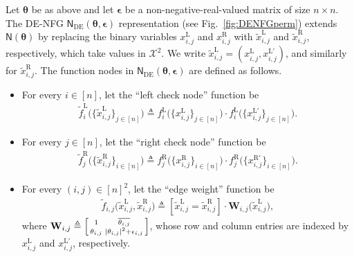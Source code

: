 \documentclass[conference]{IEEEtran}
\theoremstyle{plain}
\theoremstyle{definition}
\newcommand{\sfn}{\mathsf{N}}
\newcommand{\fr}[1]{ f^{\mathrm{R}}_{ #1 } }
\newcommand{\fl}[1]{ f^{\mathrm{L}}_{ #1 } }
\newcommand{\xr}[1]{ x^{\mathrm{R}}_{ #1 } }
\newcommand{\xl}[1]{ x^{\mathrm{L}}_{ #1 } }
\newcommand{\xlprime}[1]{ x^{\mathrm{L}'}_{ #1 } }
\newcommand{\tfr}[1]{\widetilde{f}^{\mathrm{R}}_{ #1 }}
\newcommand{\tfl}[1]{\widetilde{f}^{\mathrm{L}}_{ #1 }}
\newcommand{\tfe}[1]{\widetilde {f}_{ #1 }}
\newcommand{\txr}[1]{\widetilde{x}^{\mathrm{R}}_{ #1 }}
\newcommand{\txl}[1]{\widetilde{x}^{\mathrm{L}}_{ #1 }}
\newcommand{\btheta}{\boldsymbol{\theta}}
\newcommand{\defeq}{\triangleq}
\newcommand{\sfnDE}{\sfn_{\mathrm{DE}}}
\newcommand{\bepsilon}{\boldsymbol{\epsilon}}
\begin{document}
Let $\btheta$ be as above and let $\bepsilon$ be a non-negative-real-valued
matrix of size $n\times n$. The DE-NFG $\sfnDE(\btheta,\boldsymbol\epsilon)$
representation \cite{caoDoubleedgeFactorGraphs2017} (see
Fig.~\ref{fig:DENFGperm}) extends $\sfn(\btheta)$ by replacing the binary
variables $\xl{i,j}$ and $\xr{i,j}$ with $\txl{i,j}$ and $\txr{i,j}$,
respectively, which take values in $\mathcal X^2$. We write
$\txl{i,j}=(\xl{i,j},\xlprime{i,j})$, and similarly for $\txr{i,j}$. The
function nodes in $\sfnDE(\btheta,\bepsilon)$ are defined as follows.
\begin{itemize}

 \item For every $i \in [n]$, let the ``left check node'' function be
 \begin{align*}
  \tfl{i}\bigl(\{\txl{i,j}\}_{j\in[n]}\bigr) \defeq \fl{i}\bigl(\{ \xl{i,j} \}_{j \in [n]}\bigr)\cdot \fl{i}\bigl(\{ x^{\mathrm{L}'}_{i,j} \}_{j \in [n]}\bigr).
 \end{align*}

 \item For every $j \in [n]$, let the ``right check node'' function be
 \begin{align*}
  \tfr{j}\bigl(\{\txr{i,j}\}_{i\in[n]}\bigr) \defeq \fr{j}\bigl(\{ \xr{i,j} \}_{i \in [n]}\bigr)\cdot \fr{j} \bigl(\{ x^{\mathrm{R}'}_{i,j} \}_{i \in [n]}\bigr).
 \end{align*}

 \item For every $(i,j) \in [n]^2$, let the ``edge weight'' function be
 \begin{align*}
  \tfe{i,j}\bigl(\txl{i,j},\txr{i,j}\bigr)\defeq  \left[\txl{i,j}=\txr{i,j}\right]\cdot \mathbf W_{i,j}\bigl(\txl{i,j}\bigr),
 \end{align*}
 where
 $\mathbf W_{i,j}
  \defeq
  \Bigl[
   \begin{smallmatrix}
    1            & \overline{\theta_{i,j}} \\
    \theta_{i,j} & |\theta_{i,j}|^2+\epsilon_{i,j}
   \end{smallmatrix}
   \Bigr]$,
 whose row and column entries are indexed by $\xl{i,j}$ and
 $\xlprime{i,j}$, respectively.
\end{itemize}

\end{document}
